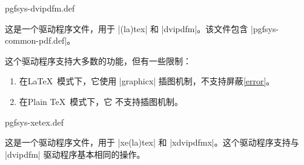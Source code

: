 \begin{filedescription}{pgfsys-dvipdfm.def}

    这是一个驱动程序文件，用于 |(la)tex| 和 |dvipdfm|。该文件包含 |pgfsys-common-pdf.def|。


    这个驱动程序支持大多数\pgfname 的功能，但有一些限制：
    \begin{enumerate}
        \item 在\LaTeX\ 模式下，它使用 |graphicx| 插图机制，不支持屏蔽\ref{error}。
        \item 在Plain \TeX\ 模式下，它 不支持插图机制。
    \end{enumerate}
\end{filedescription}

\begin{filedescription}{pgfsys-xetex.def}

    这是一个驱动程序文件，用于 |xe(la)tex| 和 |xdvipdfmx|。这个驱动程序支持与 |dvipdfm| 驱动程序基本相同的操作。
\end{filedescription}

